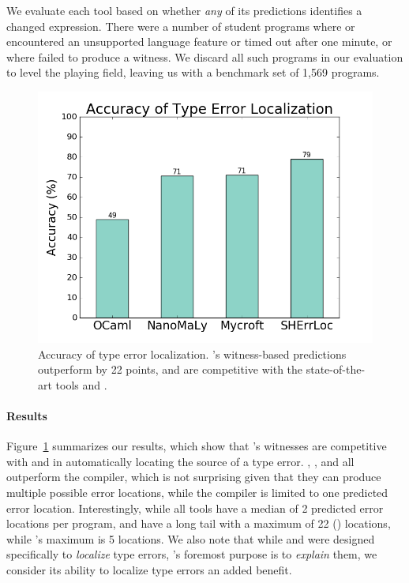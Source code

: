 We evaluate each tool based on whether \emph{any} of its predictions
identifies a changed expression.
%
There were a number of student programs where \mycroft or \sherrloc
encountered an unsupported language feature or timed out after one
minute, or where \toolname failed to produce a witness.
%
We discard all such programs in our evaluation to level the playing
field, leaving us with a benchmark set of 1,569 programs.

\begin{figure}[t]
\includegraphics[width=0.8\linewidth]{blame.png}
\caption{Accuracy of type error localization. \toolname's witness-based
  predictions outperform \ocaml by 22 points, and are competitive
  with the state-of-the-art tools \mycroft and \sherrloc.}
\label{fig:results-blame}
\end{figure}

\paragraph{Results}
Figure~\ref{fig:results-blame} summarizes our results, which show that
\toolname's witnesses are competitive with \mycroft and \sherrloc in
automatically locating the source of a type error.
%
\toolname, \mycroft, and \sherrloc all outperform the \ocaml compiler,
which is not surprising given that they can produce multiple possible
error locations, while the \ocaml compiler is limited to one predicted
error location.
%
Interestingly, while all tools have a median of 2 predicted error
locations per program, \mycroft and \sherrloc have a long tail with a
maximum of 22 () locations, while \toolname's maximum is 5
locations.
%
We also note that while \mycroft and \sherrloc were designed
specifically to \emph{localize} type errors, \toolname's foremost
purpose is to \emph{explain} them, we consider its ability to localize
type errors an added benefit.

